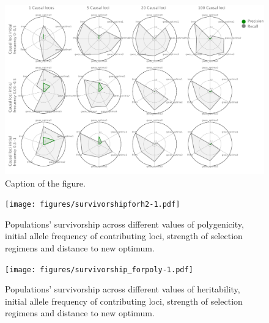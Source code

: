 \documentclass{article}
\begin{document}
\begin{figure}[b]
    \centering
    \includegraphics[width=1\textwidth]{figures/metrics.pdf}
    \caption{Caption of the figure.}
    \label{fig:metrics}
\end{figure}



\begin{figure}[b]
    \centering
    \texttt{[image: figures/survivorshipforh2-1.pdf]}
    \caption{Populations' survivorship across different values of polygenicity, initial allele frequency of contributing loci, strength of selection regimens and distance to new optimum.}
    \label{fig:survivorshipforh2}
\end{figure}

\begin{figure}[b]
    \centering
    \texttt{[image: figures/survivorship\_forpoly-1.pdf]}
    \caption{Populations' survivorship across different values of heritability, initial allele frequency of contributing loci, strength of selection regimens and distance to new optimum.}
    \label{fig:survivorship_forpoly}
\end{figure}
\end{document}
